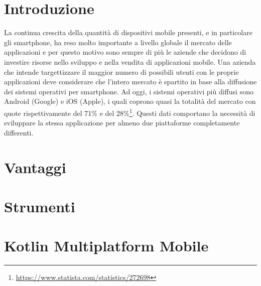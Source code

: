 
\section{Introduzione}
La continua crescita della quantità di dispositivi mobile presenti, e in particolare gli smartphone, ha reso molto importante a livello globale il mercato delle applicazioni e per questo motivo sono sempre di più le aziende che decidono di investire risorse nello sviluppo e nella vendita di applicazioni mobile. Una azienda che intende targettizzare il maggior numero di possibili utenti con le proprie applicazioni deve considerare che l'intero mercato è spartito in base alla diffusione dei sistemi operativi per smartphone. Ad oggi, i sistemi operativi più diffusi sono Android (Google) e iOS (Apple), i quali coprono quasi la totalità del mercato con quote rispettivamente del 71\% e del 28\%\footnote{\href{https://www.statista.com/statistics/272698/global-market-share-held-by-mobile-operating-systems-since-2009/}{https://www.statista.com/statistics/272698}}. Questi dati comportano la necessità di sviluppare la stessa applicazione per almeno due piattaforme completamente differenti.


\section{Vantaggi}

\section{Strumenti}

\section{Kotlin Multiplatform Mobile}
